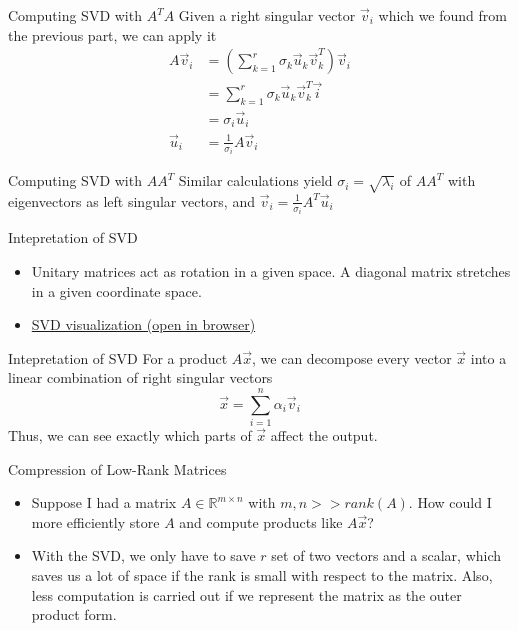 \documentclass{beamer}
\begin{document}
    \begin{frame}{Computing SVD with $A^T A$}
Given a right singular vector $\vec{v}_i$ which we found from the previous part, we can apply it
		\begin{align*}
			A \vec{v}_i &= \left( \sum_{k = 1}^r \sigma_k \vec{u}_k \vec{v}_k^T \right) \vec{v}_i \\
			&= \sum_{k = 1}^r \sigma_k \vec{u}_k \vec{v}_k^T \vec{i} \\
			&= \sigma_i \vec{u}_i \\
			\vec{u}_i &= \frac{1}{\sigma_i} A \vec{v}_i
		\end{align*}
    \end{frame}

    \begin{frame}{Computing SVD with $A A^T$}
        Similar calculations yield $\sigma_i = \sqrt{\lambda_i}$ of $A A^T$ with eigenvectors as left singular vectors, and $\vec{v}_i = \frac{1}{\sigma_i} A^T \vec{u}_i$
    \end{frame}

    \begin{frame}{Intepretation of SVD}
    \begin{itemize}
    	\item Unitary matrices act as rotation in a given space. A diagonal matrix stretches in a given coordinate space.
    	
    	\item \href{https://en.wikipedia.org/wiki/File:Singular_value_decomposition.gif}{SVD visualization (open in browser)}
    \end{itemize}
		

		

    \end{frame}

    \begin{frame}{Intepretation of SVD}
		For a product $A \vec{x}$, we can decompose every vector $\vec{x}$ into a linear combination of right singular vectors
		\[ \vec x = \sum_{i = 1}^n \alpha_i \vec{v}_i \]
		Thus, we can see exactly which parts of $\vec{x}$ affect the output.
    \end{frame}


	\begin{frame}{Compression of Low-Rank Matrices}
	\begin{itemize}[<+->]
	\item Suppose I had a matrix $A \in \mathbb{R}^{m \times n}$ with $m, n >> rank(A)$. How could I more efficiently store $A$ and compute products like $A \vec{x}$?
	\vspace{2em}
	\item With the SVD, we only have to save $r$ set of two vectors and a scalar, which saves us a lot of space if the rank is small with respect to the matrix. Also, less computation is carried out if we represent the matrix as the outer product form.
	\end{itemize}
	\end{frame}
\end{document}
